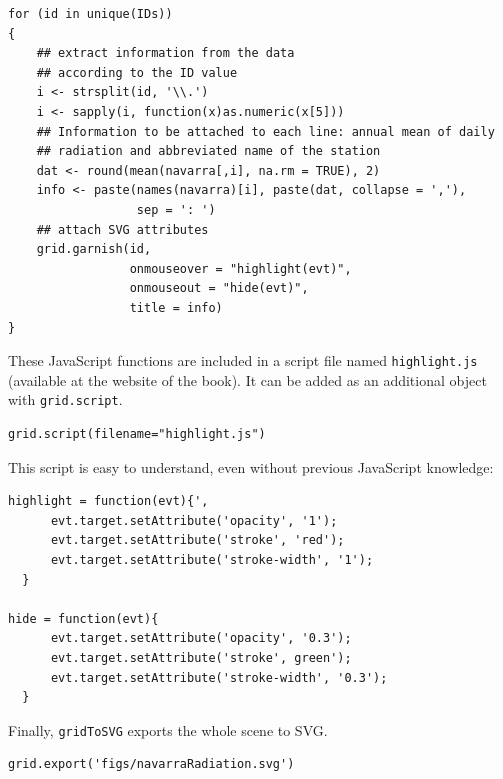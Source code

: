 \documentclass[smallroyalvopaper]{memoir}
\begin{document}

\lstset{language=r,label= ,caption= ,captionpos=b,numbers=none}
\begin{lstlisting}
for (id in unique(IDs))
{
    ## extract information from the data
    ## according to the ID value
    i <- strsplit(id, '\\.')
    i <- sapply(i, function(x)as.numeric(x[5]))
    ## Information to be attached to each line: annual mean of daily
    ## radiation and abbreviated name of the station
    dat <- round(mean(navarra[,i], na.rm = TRUE), 2)
    info <- paste(names(navarra)[i], paste(dat, collapse = ','),
                  sep = ': ')
    ## attach SVG attributes
    grid.garnish(id,
                 onmouseover = "highlight(evt)",
                 onmouseout = "hide(evt)",
                 title = info)
}
\end{lstlisting}

These JavaScript functions are included in a script file named
\texttt{highlight.js} (available at the website of the book). It can be
added as an additional object with \texttt{grid.script}.


\lstset{language=r,label= ,caption= ,captionpos=b,numbers=none}
\begin{lstlisting}
grid.script(filename="highlight.js")
\end{lstlisting}

This script is easy to understand, even without previous
JavaScript knowledge:
\begin{verbatim}
highlight = function(evt){',
      evt.target.setAttribute('opacity', '1');
      evt.target.setAttribute('stroke', 'red');
      evt.target.setAttribute('stroke-width', '1');
  }
  
hide = function(evt){
      evt.target.setAttribute('opacity', '0.3');
      evt.target.setAttribute('stroke', green');
      evt.target.setAttribute('stroke-width', '0.3');
  }
\end{verbatim}

Finally, \texttt{gridToSVG} exports the whole scene to SVG. 


\lstset{language=r,label= ,caption= ,captionpos=b,numbers=none}
\begin{lstlisting}
grid.export('figs/navarraRadiation.svg')
\end{lstlisting}
\end{document}
